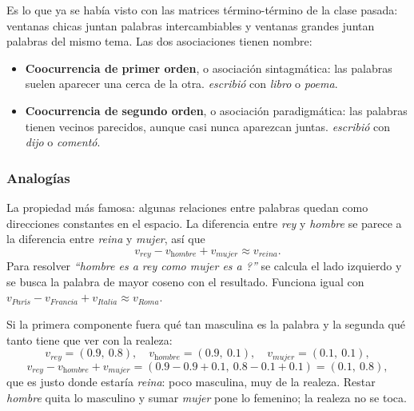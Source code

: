 \documentclass[11pt,letterpaper]{article}
\begin{document}
Es lo que ya se había visto con las matrices término-término de la
clase pasada: ventanas chicas juntan palabras intercambiables y
ventanas grandes juntan palabras del mismo tema. Las dos asociaciones
tienen nombre:

\begin{itemize}[itemsep=0.3em]
    \item \textbf{Coocurrencia de primer orden}, o asociación
          sintagmática: las palabras suelen aparecer una cerca de la
          otra. \textit{escribió} con \textit{libro} o \textit{poema}.
    \item \textbf{Coocurrencia de segundo orden}, o asociación
          paradigmática: las palabras tienen vecinos parecidos, aunque
          casi nunca aparezcan juntas. \textit{escribió} con
          \textit{dijo} o \textit{comentó}.
\end{itemize}

\subsubsection*{Analogías}

La propiedad más famosa: algunas relaciones entre palabras quedan
como direcciones constantes en el espacio. La diferencia entre
\textit{rey} y \textit{hombre} se parece a la diferencia entre
\textit{reina} y \textit{mujer}, así que
\[
    v_{\textit{rey}} - v_{\textit{hombre}} + v_{\textit{mujer}}
    \approx v_{\textit{reina}} .
\]
Para resolver \textit{``hombre es a rey como mujer es a ?''} se
calcula el lado izquierdo y se busca la palabra de mayor coseno con el
resultado. Funciona igual con
$v_{\textit{París}} - v_{\textit{Francia}} + v_{\textit{Italia}}
\approx v_{\textit{Roma}}$.

\begin{ejemplo}
    Si la primera componente fuera qué tan masculina es la palabra y la
    segunda qué tanto tiene que ver con la realeza:
    \[
        v_{\textit{rey}} = (0.9,\ 0.8) , \quad
        v_{\textit{hombre}} = (0.9,\ 0.1) , \quad
        v_{\textit{mujer}} = (0.1,\ 0.1) ,
    \]
    \[
        v_{\textit{rey}} - v_{\textit{hombre}} + v_{\textit{mujer}}
        = (0.9 - 0.9 + 0.1,\ 0.8 - 0.1 + 0.1) = (0.1,\ 0.8) ,
    \]
    que es justo donde estaría \textit{reina}: poco masculina, muy de
    la realeza. Restar \textit{hombre} quita lo masculino y sumar
    \textit{mujer} pone lo femenino; la realeza no se toca.
\end{ejemplo}
\end{document}
